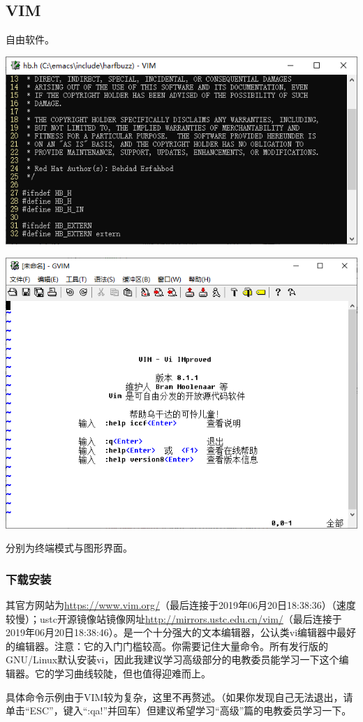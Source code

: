 \subsection{VIM}
自由软件。
\begin{center}
	\includegraphics[scale=0.35]{pic/vim.png}\par   \includegraphics[scale=0.35]{pic/gvim.png}
\end{center} \par
分别为终端模式与图形界面。
\subsubsection{下载安装}
其官方网站为\url{https://www.vim.org/}（最后连接于2019年06月20日18:38:36）（速度较慢）；ustc开源镜像站镜像网址\url{http://mirrors.ustc.edu.cn/vim/}（最后连接于2019年06月20日18:38:46）。是一个十分强大的文本编辑器，公认类vi编辑器中最好的编辑器。注意：它的入门门槛较高。你需要记住大量命令。所有发行版的GNU/Linux默认安装vi，因此我建议学习高级部分的电教委员能学习一下这个编辑器。它的学习曲线较陡，但也值得迎难而上。\par
具体命令示例由于VIM较为复杂，这里不再赘述。（如果你发现自己无法退出，请单击“ESC”，键入“:qa!”并回车）但建议希望学习“高级”篇的电教委员学习一下。
